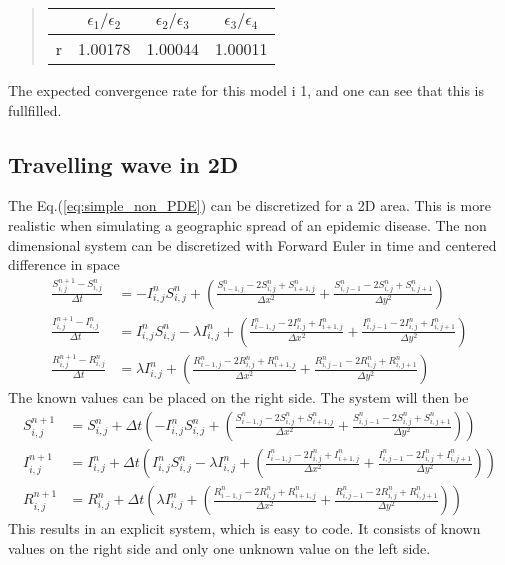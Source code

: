 \documentclass[%
twoside,                 %
final,                   %
chapterprefix=true,      %
open=right               %
10pt]{book}
\begin{document}
\begin{quote}
\begin{tabular}{cccc}
\hline
\multicolumn{1}{c}{  } & \multicolumn{1}{c}{ $\epsilon_1/\epsilon_2$ } & \multicolumn{1}{c}{ $\epsilon_2/\epsilon_3$ } & \multicolumn{1}{c}{ $\epsilon_3/\epsilon_4$ } \\
\hline
r & 1.00178                 & 1.00044                 & 1.00011                 \\
\hline
\end{tabular}
\end{quote}

\noindent
The expected convergence rate for this model i 1, and one can see that this is fullfilled.
\subsection{Travelling wave in 2D}
The Eq.(\ref{eq:simple_non_PDE}) can be discretized for a 2D area. This is more realistic when simulating a geographic spread of an epidemic disease. The non dimensional system  can be discretized with Forward Euler in time and centered difference in space
\begin{equation} \label{eq:SIR_disc}
	\begin{aligned}
    \frac{S^{n+1}_{i,j}-S^n_{i,j}}{\Delta t} &= -I^{n}_{i,j}S^{n}_{i,j} + \left(\frac{S^{n}_{i-1,j}-2S^{n}_{i,j}+S^{n}_{i+1,j}}{\Delta x^2}+\frac{S^{n}_{i,j-1}-2S^{n}_{i,j}+S^{n}_{i,j+1}}{\Delta y^2}\right) \\
    \frac{I^{n+1}_{i,j}-I^n_{i,j}}{\Delta t} &= I^{n}_{i,j}S^{n}_{i,j} -\lambda I^{n}_{i,j} + \left(\frac{I^{n}_{i-1,j}-2I^{n}_{i,j}+I^{n}_{i+1,j}}{\Delta x^2}+\frac{I^{n}_{i,j-1}-2I^{n}_{i,j}+I^{n}_{i,j+1}}{\Delta y^2}\right) \\
    \frac{R^{n+1}_{i,j}-R^n_{i,j}}{\Delta t} &= \lambda I^{n}_{i,j}+\left(\frac{R^{n}_{i-1,j}-2R^{n}_{i,j}+R^{n}_{i+1,j}}{\Delta x^2}+\frac{R^{n}_{i,j-1}-2R^{n}_{i,j}+R^{n}_{i,j+1}}{\Delta y^2}\right) 
	\end{aligned}
\end{equation}
The known values can be placed on the right side. The system will then be
\begin{equation}
	\begin{aligned}
    S^{n+1}_{i,j} &= S^{n}_{i,j}+\Delta t\left(-I^{n}_{i,j}S^{n}_{i,j} + \left(\frac{S^{n}_{i-1,j}-2S^{n}_{i,j}+S^{n}_{i+1,j}}{\Delta x^2}+\frac{S^{n}_{i,j-1}-2S^{n}_{i,j}+S^{n}_{i,j+1}}{\Delta y^2}\right)\right) \\
    I^{n+1}_{i,j} &= I^{n}_{i,j}+\Delta t\left(I^{n}_{i,j}S^{n}_{i,j} -\lambda I^{n}_{i,j} + \left(\frac{I^{n}_{i-1,j}-2I^{n}_{i,j}+I^{n}_{i+1,j}}{\Delta x^2}+\frac{I^{n}_{i,j-1}-2I^{n}_{i,j}+I^{n}_{i,j+1}}{\Delta y^2}\right)\right) \\
    R^{n+1}_{i,j} &= R^{n}_{i,j}+\Delta t\left(\lambda I^{n}_{i,j}+\left(\frac{R^{n}_{i-1,j}-2R^{n}_{i,j}+R^{n}_{i+1,j}}{\Delta x^2}+\frac{R^{n}_{i,j-1}-2R^{n}_{i,j}+R^{n}_{i,j+1}}{\Delta y^2}\right)\right) 
	\end{aligned}
\end{equation}
This results in an explicit system, which is easy to code. It consists of known values on the right side and only one unknown value on the left side.
\end{document}
